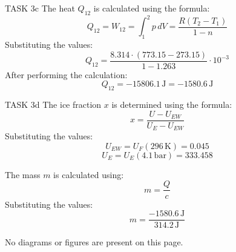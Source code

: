 TASK 3c  
The heat \( Q_{12} \) is calculated using the formula:  
\[
Q_{12} = W_{12} = \int_{1}^{2} p \, dV = \frac{R(T_2 - T_1)}{1 - n}
\]  
Substituting the values:  
\[
Q_{12} = \frac{8.314 \cdot (773.15 - 273.15)}{1 - 1.263} \cdot 10^{-3}
\]  
After performing the calculation:  
\[
Q_{12} = -15806.1 \, \text{J} = -1580.6 \, \text{J}
\]  

TASK 3d  
The ice fraction \( x \) is determined using the formula:  
\[
x = \frac{U - U_{EW}}{U_E - U_{EW}}
\]  
Substituting the values:  
\[
U_{EW} = U_{F}(296 \, \text{K}) = 0.045
\]  
\[
U_E = U_{E}(4.1 \, \text{bar}) = 333.458
\]  

The mass \( m \) is calculated using:  
\[
m = \frac{Q}{c}
\]  
Substituting the values:  
\[
m = \frac{-1580.6 \, \text{J}}{314.2 \, \text{J}}
\]  

No diagrams or figures are present on this page.